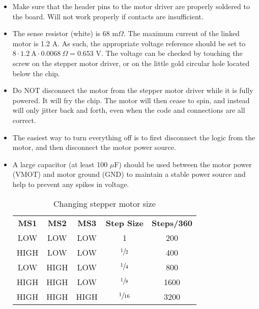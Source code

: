 \documentclass[12pt]{article}
\begin{document}
\begin{itemize}
	\item Make sure that the header pins to the motor driver are properly soldered to the board. Will not work properly if contacts are insufficient.
	\item The sense resistor (white) is 68 m$\Omega$. The maximum current of the linked motor is 1.2 A. As such, the appropriate voltage reference should be set to $8\cdot1.2~\mathrm{A}\cdot0.0068~\Omega = 0.653$ V. The voltage can be checked by touching the screw on the stepper motor driver, or on the little gold circular hole located below the chip.
	\item Do NOT disconnect the motor from the stepper motor driver while it is fully powered. It will fry the chip. The motor will then cease to spin, and instead will only jitter back and forth, even when the code and connections are all correct.
	\item The easiest way to turn everything off is to first disconnect the logic from the motor, and then disconnect the motor power source.
	\item A large capacitor (at least 100 $\mu$F) should be used between the motor power (VMOT) and motor ground (GND) to maintain a stable power source and help to prevent any spikes in voltage.
	\begin{table}[H]
		\centering
		\begin{tabular}{c | c | c | c | c}
			\textbf{MS1} 	& \textbf{MS2} & \textbf{MS3} & \textbf{Step Size} & \textbf{Steps/360\degree} \\ \cline{1-5}
			LOW  & LOW  & LOW  & 1 & 200  \\
			HIGH & LOW  & LOW  & $\sfrac{1}{2}$ & 400  \\
			LOW  & HIGH & LOW  & $\sfrac{1}{4}$ & 800 \\
			HIGH & HIGH & LOW  & $\sfrac{1}{8}$ & 1600 \\
			HIGH & HIGH & HIGH & $\sfrac{1}{16}$ & 3200 \\
		\end{tabular}
		\caption{Changing stepper motor size}
		\label{tbl:mspins}
	\end{table}	
\end{itemize}
\end{document}
